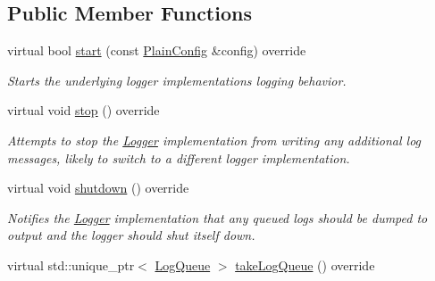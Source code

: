 \subsection*{Public Member Functions}
\begin{DoxyCompactItemize}
\item 
virtual bool \hyperlink{class_aws_1_1_iot_1_1_device_client_1_1_logging_1_1_std_out_logger_aa27086cd009717d85b957ef1740b14e9}{start} (const \hyperlink{struct_aws_1_1_iot_1_1_device_client_1_1_plain_config}{Plain\+Config} \&config) override
\begin{DoxyCompactList}\small\item\em Starts the underlying logger implementation\textquotesingle{}s logging behavior. \end{DoxyCompactList}\item 
\mbox{\label{class_aws_1_1_iot_1_1_device_client_1_1_logging_1_1_std_out_logger_a1bf5765608b8109129488fe2bfa8616c}} 
virtual void \hyperlink{class_aws_1_1_iot_1_1_device_client_1_1_logging_1_1_std_out_logger_a1bf5765608b8109129488fe2bfa8616c}{stop} () override
\begin{DoxyCompactList}\small\item\em Attempts to stop the \hyperlink{class_aws_1_1_iot_1_1_device_client_1_1_logging_1_1_logger}{Logger} implementation from writing any additional log messages, likely to switch to a different logger implementation. \end{DoxyCompactList}\item 
\mbox{\label{class_aws_1_1_iot_1_1_device_client_1_1_logging_1_1_std_out_logger_ae0e55f2d2a1ce818ddb4ed14c293051f}} 
virtual void \hyperlink{class_aws_1_1_iot_1_1_device_client_1_1_logging_1_1_std_out_logger_ae0e55f2d2a1ce818ddb4ed14c293051f}{shutdown} () override
\begin{DoxyCompactList}\small\item\em Notifies the \hyperlink{class_aws_1_1_iot_1_1_device_client_1_1_logging_1_1_logger}{Logger} implementation that any queued logs should be dumped to output and the logger should shut itself down. \end{DoxyCompactList}\item 
virtual std\+::unique\+\_\+ptr$<$ \hyperlink{class_aws_1_1_iot_1_1_device_client_1_1_logging_1_1_log_queue}{Log\+Queue} $>$ \hyperlink{class_aws_1_1_iot_1_1_device_client_1_1_logging_1_1_std_out_logger_acff57144a637686b21f27aa0da9628a2}{take\+Log\+Queue} () override

\end{DoxyCompactItemize}
